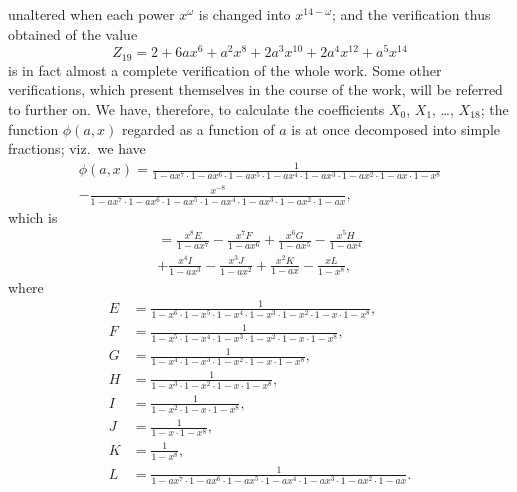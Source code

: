 \documentclass[11pt,a4paper]{article}
\begin{document}
\clearpage
unaltered when each power $x^\omega$ is changed into $x^{14-\omega}$; and the verification thus obtained of the value
\[
Z_{19} = 2 + 6ax^6 + a^2x^8 + 2a^3x^{10} + 2a^4x^{12} + a^5x^{14}
\]
is in fact almost a complete verification of the whole work. Some other verifications, which present themselves in the course of the work, will be referred to further on. We have, therefore, to calculate the coefficients $X_0$, $X_1$, \dots, $X_{18}$; the function $\phi(a, x)$ regarded as a function of $a$ is at once decomposed into simple fractions; viz.\ we have
\begin{multline*}
\phi(a, x) = \frac{1}{1 - ax^7 \cdot 1 - ax^6 \cdot 1 - ax^5 \cdot 1 - ax^4 \cdot 1 - ax^3 \cdot 1 - ax^2 \cdot 1 - ax \cdot 1 - x^8} \\
- \frac{x^{-8}}{1 - ax^7 \cdot 1 - ax^6 \cdot 1 - ax^5 \cdot 1 - ax^4 \cdot 1 - ax^3 \cdot 1 - ax^2 \cdot 1 - ax},
\end{multline*}
which is
\begin{multline*}
= \frac{x^8E}{1 - ax^7} - \frac{x^7F}{1 - ax^6} + \frac{x^6G}{1 - ax^5} - \frac{x^5H}{1 - ax^4} \\
+ \frac{x^4I}{1 - ax^3} - \frac{x^3J}{1 - ax^2} + \frac{x^2K}{1 - ax} - \frac{xL}{1 - x^8},
\end{multline*}
where
\begin{align*}
E &= \frac{1}{1 - x^6 \cdot 1 - x^5 \cdot 1 - x^4 \cdot 1 - x^3 \cdot 1 - x^2 \cdot 1 - x \cdot 1 - x^8}, \\
F &= \frac{1}{1 - x^5 \cdot 1 - x^4 \cdot 1 - x^3 \cdot 1 - x^2 \cdot 1 - x \cdot 1 - x^8}, \\
G &= \frac{1}{1 - x^4 \cdot 1 - x^3 \cdot 1 - x^2 \cdot 1 - x \cdot 1 - x^8}, \\
H &= \frac{1}{1 - x^3 \cdot 1 - x^2 \cdot 1 - x \cdot 1 - x^8}, \\
I &= \frac{1}{1 - x^2 \cdot 1 - x \cdot 1 - x^8}, \\
J &= \frac{1}{1 - x \cdot 1 - x^8}, \\
K &= \frac{1}{1 - x^8}, \\
L &= \frac{1}{1 - ax^7 \cdot 1 - ax^6 \cdot 1 - ax^5 \cdot 1 - ax^4 \cdot 1 - ax^3 \cdot 1 - ax^2 \cdot 1 - ax}.
\end{align*}
\end{document}
